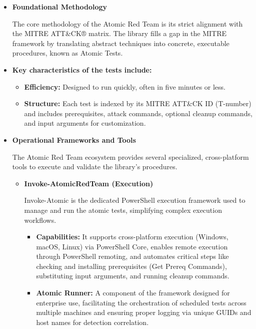 \begin{itemize}
    \item \textbf{Foundational Methodology}

The core methodology of the Atomic Red Team is its strict alignment with the MITRE ATT\&CK® matrix. The library fills a gap in the MITRE framework by translating abstract techniques into concrete, executable procedures, known as Atomic Tests.

    \item \textbf{Key characteristics of the tests include:}
        \begin{itemize}
            \item \textbf{Efficiency:} Designed to run quickly, often in five minutes or less.
             \item \textbf{Structure:} Each test is indexed by its MITRE ATT\&CK ID (T-number) and includes prerequisites, attack commands, optional cleanup commands, and input arguments for customization.
        \end{itemize}
    \item \textbf{Operational Frameworks and Tools}

The Atomic Red Team ecosystem provides several specialized, cross-platform tools to execute and validate the library's procedures.

\begin{itemize}
    \item \textbf{Invoke-AtomicRedTeam (Execution)}
    
Invoke-Atomic is the dedicated PowerShell execution framework used to manage and run the atomic tests, simplifying complex execution workflows.


\begin{itemize}
    \item \textbf{Capabilities:} It supports cross-platform execution (Windows, macOS, Linux) via PowerShell Core, enables remote execution through PowerShell remoting, and automates critical steps like checking and installing prerequisites (Get Prereq Commands), substituting input arguments, and running cleanup commands.

    \item \textbf{Atomic Runner:} A component of the framework designed for enterprise use, facilitating the orchestration of scheduled tests across multiple machines and ensuring proper logging via unique GUIDs and host names for detection correlation.
\end{itemize}


\end{itemize}
\end{itemize}
